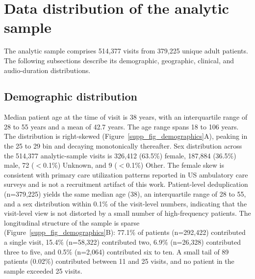\documentclass[utf8]{frontiers_suppmat} %
\begin{document}
\onecolumn
{}

\title[Supplementary Material]{{}}


\maketitle


\section{Data distribution of the analytic sample}
\label{supp:data-distribution}

The analytic sample comprises 514{,}377 visits from 379{,}225 unique adult patients. The following subsections describe its demographic, geographic, clinical, and audio-duration distributions.

\subsection{Demographic distribution}
\label{supp:demographic}

Median patient age at the time of visit is 38 years, with an interquartile range of 28 to 55 years and a mean of 42.7 years. The age range spans 18 to 106 years. The distribution is right-skewed (Figure~\ref{supp_fig_demographics}A), peaking in the 25 to 29 bin and decaying monotonically thereafter. Sex distribution across the 514{,}377 analytic-sample visits is 326{,}412 (63.5\%) female, 187{,}884 (36.5\%) male, 72 ($<$0.1\%) Unknown, and 9 ($<$0.1\%) Other. The female skew is consistent with primary care utilization patterns reported in US ambulatory care surveys \citep{cdc-namcs-sex-pc-utilization} and is not a recruitment artifact of this work. Patient-level deduplication (n=379{,}225) yields the same median age (38), an interquartile range of 28 to 55, and a sex distribution within 0.1\% of the visit-level numbers, indicating that the visit-level view is not distorted by a small number of high-frequency patients. The longitudinal structure of the sample is sparse (Figure~\ref{supp_fig_demographics}B): 77.1\% of patients (n=292{,}422) contributed a single visit, 15.4\% (n=58{,}322) contributed two, 6.9\% (n=26{,}328) contributed three to five, and 0.5\% (n=2{,}064) contributed six to ten. A small tail of 89 patients (0.02\%) contributed between 11 and 25 visits, and no patient in the sample exceeded 25 visits.
\end{document}
